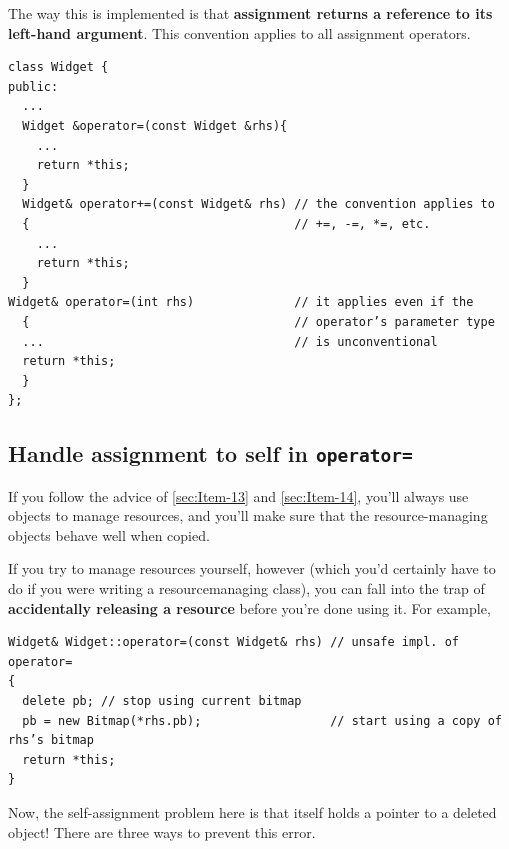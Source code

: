 The way this is implemented is that \textbf{assignment returns a
  reference to its left-hand argument}. This convention applies to all
assignment operators.

\begin{verbatim}
class Widget {
public:
  ...
  Widget &operator=(const Widget &rhs){
    ...
    return *this;
  }
  Widget& operator+=(const Widget& rhs) // the convention applies to 
  {                                     // +=, -=, *=, etc.
    ...
    return *this;
  }
Widget& operator=(int rhs)              // it applies even if the
  {                                     // operator’s parameter type
  ...                                   // is unconventional
  return *this;
  }
};
\end{verbatim}

\subsection{Handle assignment to self in \texttt{operator=}}
\label{sec:Item-11}

If you follow the advice of \ref{sec:Item-13} and \ref{sec:Item-14},
you'll always use objects to  manage resources, and you'll make sure
that the resource-managing objects behave well when copied.

If you try to manage resources yourself, however (which you'd
certainly have to do if you were writing a resourcemanaging class),
you can fall into the trap of \textbf{accidentally releasing a
  resource} before you're done using it. For example,
\begin{verbatim}
Widget& Widget::operator=(const Widget& rhs) // unsafe impl. of operator=
{
  delete pb; // stop using current bitmap
  pb = new Bitmap(*rhs.pb);                  // start using a copy of rhs’s bitmap
  return *this;                              
}
\end{verbatim}

Now, the self-assignment problem here is that itself holds a pointer
to a deleted object! There are three ways to prevent this error.

